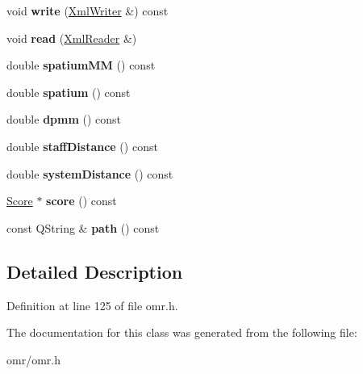 \begin{DoxyCompactItemize}
void {\bfseries write} (\hyperlink{class_ms_1_1_xml_writer}{Xml\+Writer} \&) const
\item 
\mbox{\label{class_ms_1_1_omr_a3e0018d204e306c6d53c2db1abb7b6a0}} 
void {\bfseries read} (\hyperlink{class_ms_1_1_xml_reader}{Xml\+Reader} \&)
\item 
\mbox{\label{class_ms_1_1_omr_a68a1b095f6acfa5d386c9779e44ba46a}} 
double {\bfseries spatium\+MM} () const
\item 
\mbox{\label{class_ms_1_1_omr_ac08d81657fe68f2218db84c1d30f3572}} 
double {\bfseries spatium} () const
\item 
\mbox{\label{class_ms_1_1_omr_abb701abf0d9ed3cf008a03043f63cff7}} 
double {\bfseries dpmm} () const
\item 
\mbox{\label{class_ms_1_1_omr_a8afac883eccc08dbce9c29f7a12eadfc}} 
double {\bfseries staff\+Distance} () const
\item 
\mbox{\label{class_ms_1_1_omr_a7fcb9db6991af92e628fe975464367b1}} 
double {\bfseries system\+Distance} () const
\item 
\mbox{\label{class_ms_1_1_omr_ae003028b85e907922380997b8a3ec902}} 
\hyperlink{class_ms_1_1_score}{Score} $\ast$ {\bfseries score} () const
\item 
\mbox{\label{class_ms_1_1_omr_a43f94dc71abffa203cb76a2e33abd7be}} 
const Q\+String \& {\bfseries path} () const
\end{DoxyCompactItemize}


\subsection{Detailed Description}


Definition at line 125 of file omr.\+h.



The documentation for this class was generated from the following file\+:\begin{DoxyCompactItemize}
\item 
omr/omr.\+h\end{DoxyCompactItemize}
